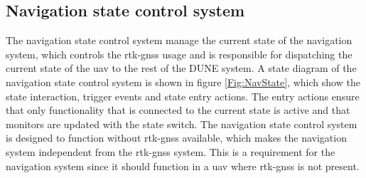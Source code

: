 \subsection{Navigation state control system}\label{S:NavState}
The navigation state control system manage the current state of the navigation system, which controls the \gls{rtk-gnss} usage and is responsible for dispatching the current state of the \gls{uav} to the rest of the DUNE system. A state diagram of the navigation state control system is shown in figure \ref{Fig:NavState}, which show the state interaction, trigger events and state entry actions. The entry actions ensure that only functionality that is connected to the current state is active      and that monitors are updated with the state switch. The navigation state control system is designed to function without \gls{rtk-gnss} available, which makes the navigation system independent from the \gls{rtk-gnss} system. This is a requirement for the navigation system since it should function in a \gls{uav} where \gls{rtk-gnss} is not present.

